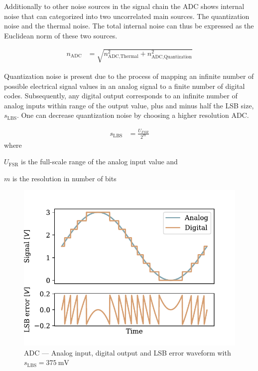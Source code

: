 Additionally to other noise sources in the signal chain the \ac{ADC} shows internal noise that can categorized into two uncorrelated main sources. The quantization noise and the thermal noise. The total internal noise can thus be expressed as the Euclidean norm of these two sources.

\begin{align}
  n_\text{ADC} &= \sqrt{n_{\text{ADC},\text{Thermal}}^2 + n_{\text{ADC},\text{Quantization}}^2}
\end{align}

Quantization noise is present due to the process of mapping an infinite number of possible electrical signal values in an analog signal to a finite number of digital codes. Subsequently, any digital output corresponds to an infinite number of analog inputs within range of the output value, plus and minus half the \ac{LSB} size, $s_\text{LBS}$. One can decrease quantization noise by choosing a higher resolution \ac{ADC}.

\begin{align}
  s_\text{LBS} &= \frac{U_{FSR}}{2^m}
\end{align}
where
\begin{description}[topsep=0ex, noitemsep]
  \item $U_{\text{FSR}}$ is the full-scale range of the analog input value and
  \item $m$ is the resolution in number of bits
\end{description}

\begin{figure}[!htb]
  \centering
  \includegraphics[scale=0.72]{figures/electronics/adc/plot_lsberr}
  \caption[ADC LSB waveform]{\ac{ADC} --- Analog input, digital output and \ac{LSB} error waveform with $s_\text{LBS} = \SI{375}{\milli\volt}$\cite{hall2020fund}%
    \label{fig:plot_lsberr}}
\end{figure}

